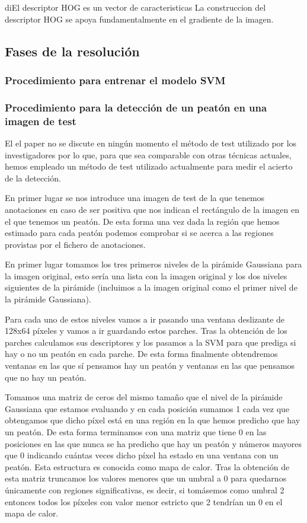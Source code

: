 \documentclass[a4paper,12pt]{article}
\begin{document}
diEl descriptor HOG es un vector de caracteristicas 
La construccion del descriptor HOG se apoya fundamentalmente en el gradiente de la imagen.

\subsection{Fases de la resolución}


\subsubsection{Procedimiento para entrenar el modelo SVM}


\subsubsection{Procedimiento para la detección de un peatón en una imagen de test}

El el paper no se discute en ningún momento el método de test utilizado por los investigadores por lo que, para que sea comparable con otras técnicas actuales, hemos empleado un método de test utilizado actualmente para medir el acierto de la detección.

En primer lugar se nos introduce una imagen de test de la que tenemos anotaciones en caso de ser positiva que nos indican el rectángulo de la imagen en el que tenemos un peatón. De esta forma una vez dada la región que hemos estimado para cada peatón podemos comprobar si se acerca a las regiones provistas por el fichero de anotaciones. 

En primer lugar tomamos los tres primeros niveles de la pirámide Gaussiana para la imagen original, esto sería una lista con la imagen original y los dos niveles siguientes de la pirámide (incluimos a la imagen original como el primer nivel de la pirámide Gaussiana). 

Para cada uno de estos niveles vamos a ir pasando una ventana deslizante de 128x64 píxeles y vamos a ir guardando estos parches. Tras la obtención de los parches calculamos sus descriptores y los pasamos a la SVM para que prediga si hay o no un peatón en cada parche. De esta forma finalmente obtendremos ventanas en las que sí pensamos hay un peatón y ventanas en las que pensamos que no hay un peatón.

Tomamos una matriz de ceros del mismo tamaño que el nivel de la pirámide Gaussiana que estamos evaluando y en cada posición sumamos 1 cada vez que obtengamos que dicho píxel está en una región en la que hemos predicho que hay un peatón. De esta forma terminamos con una matriz que tiene 0 en las posiciones en las que nunca se ha predicho que hay un peatón y números mayores que 0 indicando cuántas veces dicho píxel ha estado en una ventana con un peatón. Esta estructura es conocida como mapa de calor. Tras la obtención de esta matriz truncamos los valores menores que un umbral a 0 para quedarnos únicamente con regiones significativas, es decir, si tomásemos como umbral 2 entonces todos los píxeles con valor menor estricto que 2 tendrían un 0 en el mapa de calor. 
\end{document}
